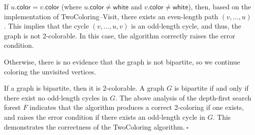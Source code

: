 \begin{enumerate}
\begin{solution}
\begin{itemize}
    If $u.\mathsf{color}=v.\mathsf{color}$ (where $u.\mathsf{color}\neq\mathsf{white}$ and $v.\mathsf{color}\neq\mathsf{white}$), then, based on the implementation of {\sc TwoColoring--Visit}, there exists an even-length path $(v,\dots,u)$. This implies that the cycle $(v,\dots,u,v)$ is an odd-length cycle, and thus, the graph is not 2-colorable. In this case, the algorithm correctly raises the error condition.

    Otherwise, there is no evidence that the graph is not bipartite, so we continue coloring the unvisited vertices.
\end{itemize}
If a graph is bipartite, then it is 2-colorable. A graph $G$ is bipartite if and only if there exist no odd-length cycles in $G$. The above analysis of the depth-first search forest $F$ indicates that the algorithm produces a correct 2-coloring if one exists, and raises the error condition if there exists an odd-length cycle in $G$. This demonstrates the correctness of the {\sc TwoColoring} algorithm.$~\square$
\end{solution}
\end{enumerate}
